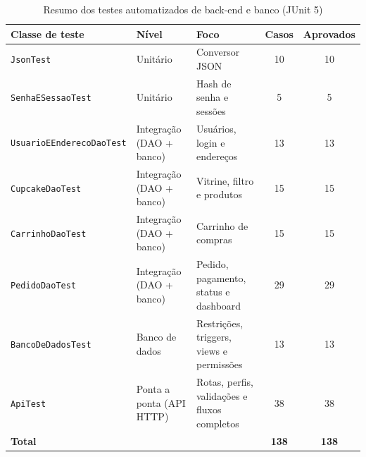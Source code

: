 \begin{table}[H]
\centering\small\renewcommand{\arraystretch}{1.25}
\begin{tabular}{|p{4.6cm}|p{3.2cm}|p{3.7cm}|c|c|}
\hline
\rowcolor{gray!30} \textbf{Classe de teste} & \textbf{Nível} & \textbf{Foco} & \textbf{Casos} & \textbf{Aprovados} \\ \hline
\texttt{JsonTest} & Unitário & Conversor JSON & 10 & 10 \\ \hline
\texttt{SenhaESessaoTest} & Unitário & Hash de senha e sessões & 5 & 5 \\ \hline
\texttt{UsuarioEEnderecoDaoTest} & Integração (DAO + banco) & Usuários, login e endereços & 13 & 13 \\ \hline
\texttt{CupcakeDaoTest} & Integração (DAO + banco) & Vitrine, filtro e produtos & 15 & 15 \\ \hline
\texttt{CarrinhoDaoTest} & Integração (DAO + banco) & Carrinho de compras & 15 & 15 \\ \hline
\texttt{PedidoDaoTest} & Integração (DAO + banco) & Pedido, pagamento, status e dashboard & 29 & 29 \\ \hline
\texttt{BancoDeDadosTest} & Banco de dados & Restrições, triggers, views e permissões & 13 & 13 \\ \hline
\texttt{ApiTest} & Ponta a ponta (API HTTP) & Rotas, perfis, validações e fluxos completos & 38 & 38 \\ \hline
\textbf{Total} & & & \textbf{138} & \textbf{138} \\ \hline
\end{tabular}\caption{Resumo dos testes automatizados de back-end e banco (JUnit 5)}\end{table}